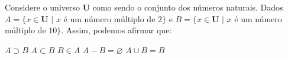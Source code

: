 \noindent\parbox{\linewidth}{

Considere o universo $\mathbf{U}$ como sendo o conjunto dos números naturais. Dados $A=\{x\in\mathbf{U}\,\,|\,\,x$ é um número múltiplo de $2\}$ e $B=\{x\in\mathbf{U}\,\,|\,\,x$ é um número múltiplo de $10\}$. Assim, podemos afirmar que:

$A\supset B$
$A\subset B$
$B\in A$
$A-B=\varnothing$
$A\cup B=B$



}



